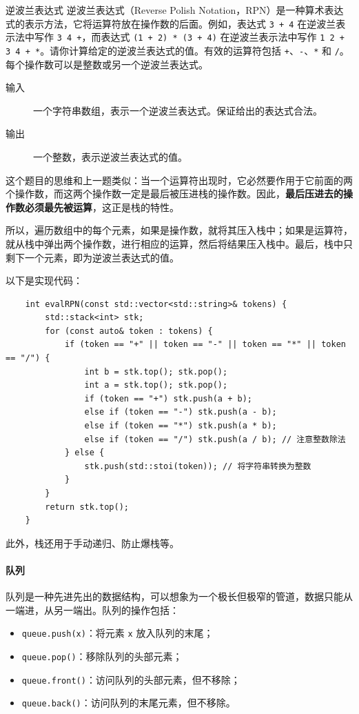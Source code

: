 \begin{example}{逆波兰表达式}{}
    逆波兰表达式（Reverse Polish Notation，RPN）是一种算术表达式的表示方法，它将运算符放在操作数的后面。例如，表达式 \verb|3 + 4| 在逆波兰表示法中写作 \verb|3 4 +|，而表达式 \verb|(1 + 2) * (3 + 4)| 在逆波兰表示法中写作 \verb|1 2 + 3 4 + *|。请你计算给定的逆波兰表达式的值。有效的运算符包括 \verb|+|、\verb|-|、\verb|*| 和 \verb|/|。每个操作数可以是整数或另一个逆波兰表达式。
    \begin{description}
        \item[输入] 一个字符串数组，表示一个逆波兰表达式。保证给出的表达式合法。
        \item[输出] 一个整数，表示逆波兰表达式的值。
    \end{description}
    \tcblower
    这个题目的思维和上一题类似：当一个运算符出现时，它必然要作用于它前面的两个操作数，而这两个操作数一定是最后被压进栈的操作数。因此，\textbf{最后压进去的操作数必须最先被运算}，这正是栈的特性。
    
    所以，遍历数组中的每个元素，如果是操作数，就将其压入栈中；如果是运算符，就从栈中弹出两个操作数，进行相应的运算，然后将结果压入栈中。最后，栈中只剩下一个元素，即为逆波兰表达式的值。
    
    以下是实现代码：
    \begin{verbatim}
    int evalRPN(const std::vector<std::string>& tokens) {
        std::stack<int> stk;
        for (const auto& token : tokens) {
            if (token == "+" || token == "-" || token == "*" || token == "/") {
                int b = stk.top(); stk.pop();
                int a = stk.top(); stk.pop();
                if (token == "+") stk.push(a + b);
                else if (token == "-") stk.push(a - b);
                else if (token == "*") stk.push(a * b);
                else if (token == "/") stk.push(a / b); // 注意整数除法
            } else {
                stk.push(std::stoi(token)); // 将字符串转换为整数
            }
        }
        return stk.top();
    }
    \end{verbatim}
\end{example}

此外，栈还用于手动递归、防止爆栈等。

\paragraph{队列}

队列是一种先进先出的数据结构，可以想象为一个极长但极窄的管道，数据只能从一端进，从另一端出。队列的操作包括：
\begin{itemize}
    \item \verb|queue.push(x)|：将元素 \verb|x| 放入队列的末尾；
    \item \verb|queue.pop()|：移除队列的头部元素；
    \item \verb|queue.front()|：访问队列的头部元素，但不移除；
    \item \verb|queue.back()|：访问队列的末尾元素，但不移除。
\end{itemize}

